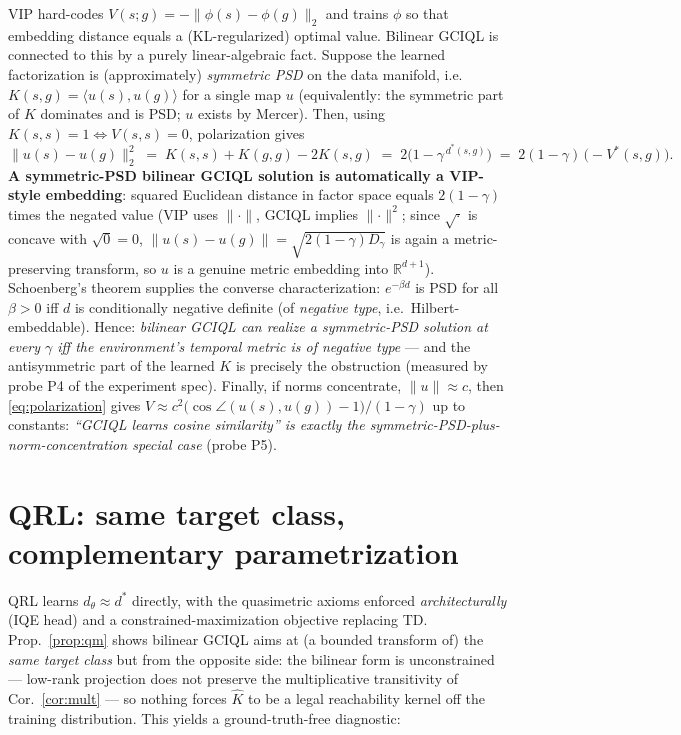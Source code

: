 \documentclass[10pt]{article}
\newcommand{\R}{\mathbb{R}}
\newcommand{\ip}[2]{\langle #1, #2 \rangle}
\begin{document}
VIP hard-codes $V(s;g) = -\lVert \phi(s)-\phi(g)\rVert_2$ and trains $\phi$ so that embedding distance equals a (KL-regularized) optimal value. Bilinear GCIQL is connected to this by a purely linear-algebraic fact. Suppose the learned factorization is (approximately) \emph{symmetric PSD} on the data manifold, i.e.\ $K(s,g)=\ip{u(s)}{u(g)}$ for a single map $u$ (equivalently: the symmetric part of $K$ dominates and is PSD; $u$ exists by Mercer). Then, using $K(s,s) = 1 \iff V(s,s)=0$, polarization gives
\begin{equation}
\big\lVert u(s) - u(g) \big\rVert_2^2 \;=\; K(s,s) + K(g,g) - 2K(s,g) \;=\; 2\big(1-\gamma^{\,d^*(s,g)}\big) \;=\; 2(1-\gamma)\,\big({-}V^*(s,g)\big).
\label{eq:polarization}
\end{equation}
\textbf{A symmetric-PSD bilinear GCIQL solution is automatically a VIP-style embedding}: squared Euclidean distance in factor space equals $2(1-\gamma)$ times the negated value (VIP uses $\lVert\cdot\rVert$, GCIQL implies $\lVert\cdot\rVert^2$; since $\sqrt{\cdot}$ is concave with $\sqrt 0=0$, $\lVert u(s)-u(g)\rVert = \sqrt{2(1-\gamma)D_\gamma}$ is again a metric-preserving transform, so $u$ is a genuine metric embedding into $\R^{d+1}$). Schoenberg's theorem supplies the converse characterization: $e^{-\beta d}$ is PSD for all $\beta>0$ iff $d$ is conditionally negative definite (of \emph{negative type}, i.e.\ Hilbert-embeddable). Hence: \emph{bilinear GCIQL can realize a symmetric-PSD solution at every $\gamma$ iff the environment's temporal metric is of negative type} --- and the antisymmetric part of the learned $K$ is precisely the obstruction (measured by probe P4 of the experiment spec). Finally, if norms concentrate, $\lVert u \rVert \approx c$, then \eqref{eq:polarization} gives $V \approx c^2\big(\cos\angle(u(s),u(g)) - 1\big)/(1-\gamma)$ up to constants: \emph{``GCIQL learns cosine similarity'' is exactly the symmetric-PSD-plus-norm-concentration special case} (probe P5).

\section{QRL: same target class, complementary parametrization}

QRL learns $d_\theta \approx d^*$ directly, with the quasimetric axioms enforced \emph{architecturally} (IQE head) and a constrained-maximization objective replacing TD. Prop.~\ref{prop:qm} shows bilinear GCIQL aims at (a bounded transform of) the \emph{same target class} but from the opposite side: the bilinear form is unconstrained --- low-rank projection does not preserve the multiplicative transitivity of Cor.~\ref{cor:mult} --- so nothing forces $\hat K$ to be a legal reachability kernel off the training distribution. This yields a ground-truth-free diagnostic:
\end{document}
